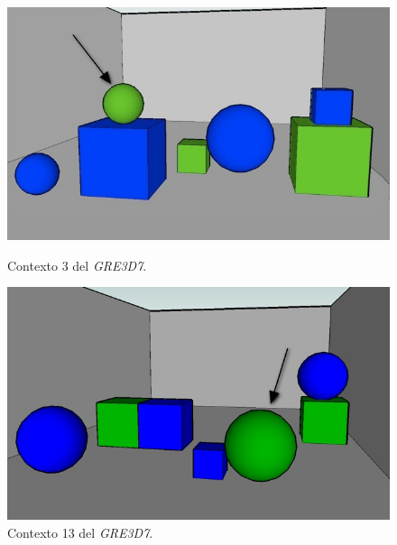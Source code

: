 \begin{figure}[ht]
\begin{minipage}[b]{0.5\linewidth}
\centering
\includegraphics[width=\textwidth]{images/3.jpg}
\caption{Contexto 3 del \textit{GRE3D7}.}
\label{GRE3D7-stimulus-3}
\end{minipage}
\begin{minipage}[b]{0.5\linewidth}
\centering
\includegraphics[width=\textwidth]{images/13.jpg}
\caption{Contexto 13 del \textit{GRE3D7}.}
\label{GRE3D7-stimulus-13}
\end{minipage}
\end{figure}

